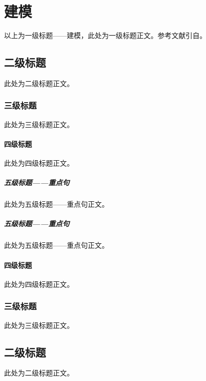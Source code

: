 
\chapter{建模}%
以上为一级标题——建模，此处为一级标题正文。参考文献引自\cite{ctex-doc}。
\section{二级标题}
此处为二级标题正文。
\subsection{三级标题}
此处为三级标题正文。
\subsubsection{四级标题}
此处为四级标题正文。
\paragraph{五级标题——重点句}
此处为五级标题——重点句正文。
\paragraph{五级标题——重点句}
此处为五级标题——重点句正文。
\subsubsection{四级标题}
此处为四级标题正文。
\subsection{三级标题}
此处为三级标题正文。
\section{二级标题}
此处为二级标题正文。
